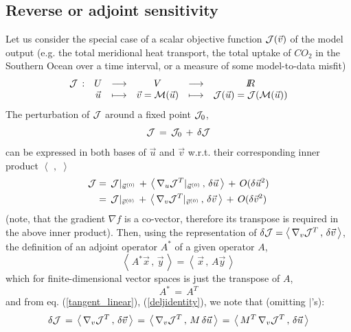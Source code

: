 \subsection{Reverse or adjoint sensitivity}
%
Let us consider the special case of a
scalar objective function ${\cal J}(\vec{v})$ of the model output (e.g. 
the total meridional heat transport, 
the total uptake of $CO_{2}$ in the Southern 
Ocean over a time interval,
or a measure of some model-to-data misfit)
%
\begin{eqnarray}
\begin{array}{cccccc}
{\cal J}  \, : &  U & 
\longrightarrow & V &   
\longrightarrow & I \!\! R \\
~       &  \vec{u} & \longmapsto     & \vec{v}={\cal M}(\vec{u}) & 
\longmapsto     & {\cal J}(\vec{u}) = {\cal J}({\cal M}(\vec{u}))
\end{array}
\label{compo}
\end{eqnarray}
%
The perturbation of $ {\cal J} $ around a fixed point $ {\cal J}_0 $,
\[
{\cal J} \, = \, {\cal J}_0 \, + \, \delta {\cal J}
\]
can be expressed in both bases of $ \vec{u} $ and $ \vec{v} $
w.r.t. their corresponding inner product 
$\left\langle \,\, , \,\, \right\rangle $ 
%
\begin{equation}
\begin{aligned}
{\cal J} & = \,
{\cal J} |_{\vec{u}^{(0)}} \, + \, 
\left\langle \, \nabla _{u}{\cal J}^T |_{\vec{u}^{(0)}} \, , \, \delta \vec{u} \, \right\rangle 
\, + \, O(\delta \vec{u}^2) \\
~ & = \,
{\cal J} |_{\vec{v}^{(0)}} \, + \, 
\left\langle \, \nabla _{v}{\cal J}^T |_{\vec{v}^{(0)}} \, , \, \delta \vec{v} \, \right\rangle
\, + \, O(\delta \vec{v}^2)
\end{aligned}
\label{deljidentity}
\end{equation}
%
(note, that the gradient $ \nabla f $ is a co-vector, therefore
its transpose is required in the above inner product).
Then, using the representation of 
$ \delta {\cal J} = 
\left\langle \, \nabla _{v}{\cal J}^T \, , \, \delta \vec{v} \, \right\rangle $,
the definition 
of an adjoint operator $ A^{\ast} $ of a given operator $ A $,
\[ 
\left\langle \, A^{\ast} \vec{x} \, , \, \vec{y} \, \right\rangle =
\left\langle \, \vec{x} \, , \,  A \vec{y} \, \right\rangle 
\]
which for finite-dimensional vector spaces is just the 
transpose of $ A $,
\[
A^{\ast} \, = \, A^T
\]
and from eq. (\ref{tangent_linear}), (\ref{deljidentity}),
we note that
(omitting $|$'s):
%
\begin{equation}
\delta {\cal J}
\, = \,
\left\langle \, \nabla _{v}{\cal J}^T \, , \, \delta \vec{v} \, \right\rangle
\, = \,
\left\langle \, \nabla _{v}{\cal J}^T \, , \, M \, \delta \vec{u} \, \right\rangle
\, = \, 
\left\langle \, M^T \, \nabla _{v}{\cal J}^T \, , \, 
\delta \vec{u} \, \right\rangle
\label{inner}
\end{equation}

